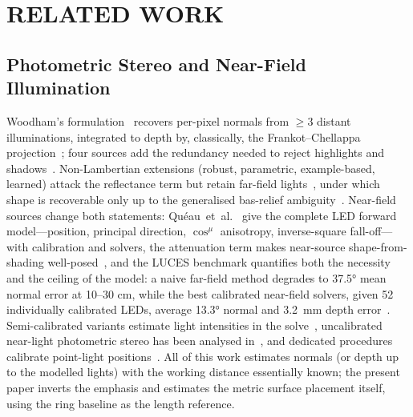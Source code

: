 \documentclass[conference]{IEEEtran}
\begin{document}
\section{RELATED WORK}\label{sec:related}

\subsection{Photometric Stereo and Near-Field Illumination}
Woodham's formulation~\cite{woodham1980} recovers per-pixel normals from
$\ge$3 distant illuminations, integrated to depth by, classically, the
Frankot--Chellappa projection~\cite{frankot1988}; four sources add the
redundancy needed to reject highlights and
shadows~\cite{coleman1982,barsky2003}.  Non-Lambertian extensions
(robust, parametric, example-based, learned) attack the reflectance term
but retain far-field lights~\cite{shi2019benchmark}, under which shape is
recoverable only up to the generalised bas-relief
ambiguity~\cite{belhumeur1999basrelief}.  Near-field sources change both
statements: Qu\'eau~et~al.~\cite{queau2018led} give the complete LED
forward model---position, principal direction, $\cos^\mu$ anisotropy,
inverse-square fall-off---with calibration and solvers, the attenuation
term makes near-source shape-from-shading
well-posed~\cite{prados2005}, and the LUCES benchmark quantifies both the
necessity and the ceiling of the model: a naive far-field method degrades
to \ang{37.5} mean normal error at 10--30 cm, while the best calibrated
near-field solvers, given 52 individually calibrated LEDs, average
\ang{13.3} normal and \SI{3.2}{\milli\meter} depth
error~\cite{mecca2021luces}.
Semi-calibrated variants estimate light intensities in the
solve~\cite{queau2017semicalibrated}, uncalibrated near-light
photometric stereo has been analysed in~\cite{papadhimitri2014uncalibrated},
and dedicated procedures calibrate point-light
positions~\cite{ma2023robust}.  All of this work estimates normals (or
depth up to the modelled lights) with the working distance essentially
known; the present paper inverts the emphasis and estimates the metric
surface placement itself, using the ring baseline as the length
reference.
\end{document}

